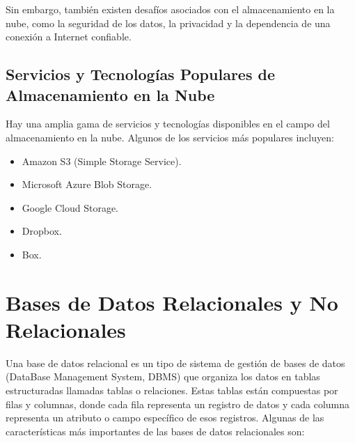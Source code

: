 \noindent Sin embargo, también existen desafíos asociados con el almacenamiento en la nube, como la seguridad de los datos, la privacidad y la dependencia de una conexión a Internet confiable.

\subsection{Servicios y Tecnologías Populares de Almacenamiento en la Nube}
Hay una amplia gama de servicios y tecnologías disponibles en el campo del almacenamiento en la nube. Algunos de los servicios más populares incluyen:
\begin{itemize}
\item Amazon S3 (Simple Storage Service).
\item Microsoft Azure Blob Storage.
\item Google Cloud Storage.
\item Dropbox.
\item Box.
\end{itemize}

\section{Bases de Datos Relacionales y No Relacionales}

Una base de datos relacional es un tipo de sistema de gestión de bases de datos (DataBase Management System, DBMS) que organiza los datos en tablas estructuradas llamadas \textquotedbl{} tablas\textquotedbl{} o \textquotedbl{}relaciones\textquotedbl{}. Estas tablas están compuestas por filas y columnas, donde cada fila representa un registro de datos y cada columna representa un atributo o campo específico de esos registros. Algunas de las características más importantes de las bases de datos relacionales son:


